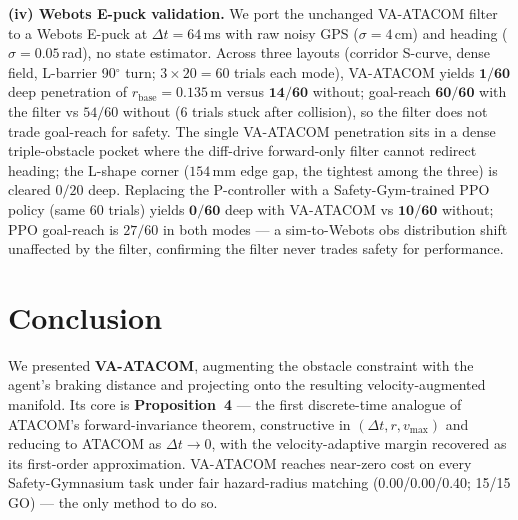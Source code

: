 \documentclass[letterpaper]{article}
\begin{document}
\textbf{(iv) Webots E-puck validation.} We port the unchanged VA-ATACOM filter to a Webots E-puck at $\Delta t{=}64$\,ms with raw noisy GPS ($\sigma{=}4$\,cm) and heading ($\sigma{=}0.05$\,rad), no state estimator. Across three layouts (corridor S-curve, dense field, L-barrier 90$^\circ$ turn; $3{\times}20{=}60$ trials each mode), VA-ATACOM yields $\mathbf{1/60}$ deep penetration of $r_\text{base}{=}0.135$\,m versus $\mathbf{14/60}$ without; goal-reach $\mathbf{60/60}$ with the filter vs $54/60$ without (6 trials stuck after collision), so the filter does not trade goal-reach for safety. The single VA-ATACOM penetration sits in a dense triple-obstacle pocket where the diff-drive forward-only filter cannot redirect heading; the L-shape corner ($154$\,mm edge gap, the tightest among the three) is cleared $0/20$ deep. Replacing the P-controller with a Safety-Gym-trained PPO policy (same 60 trials) yields $\mathbf{0/60}$ deep with VA-ATACOM vs $\mathbf{10/60}$ without; PPO goal-reach is $27/60$ in both modes --- a sim-to-Webots obs distribution shift unaffected by the filter, confirming the filter never trades safety for performance.

\section{Conclusion}

We presented \textbf{VA-ATACOM}, augmenting the obstacle constraint with the agent's braking distance and projecting onto the resulting velocity-augmented manifold. Its core is \textbf{Proposition~4} --- the first discrete-time analogue of ATACOM's forward-invariance theorem, constructive in $(\Delta t, r, v_{\max})$ and reducing to ATACOM as $\Delta t\to0$, with the velocity-adaptive margin recovered as its first-order approximation. VA-ATACOM reaches near-zero cost on every Safety-Gymnasium task under fair hazard-radius matching (0.00/0.00/0.40; 15/15 GO) --- the only method to do so.





\end{document}
